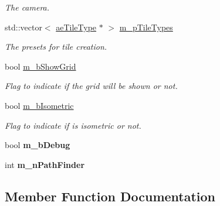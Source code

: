 \begin{DoxyCompactItemize}
\begin{DoxyCompactList}\small\item\em The camera. \end{DoxyCompactList}\item 
std\+::vector$<$ \hyperlink{classae_tile_type}{ae\+Tile\+Type} $\ast$ $>$ \hyperlink{classae_tiled_map_a09b498b021eb6ccdec0296355217b665}{m\+\_\+p\+Tile\+Types}\hypertarget{classae_tiled_map_a09b498b021eb6ccdec0296355217b665}{}\label{classae_tiled_map_a09b498b021eb6ccdec0296355217b665}

\begin{DoxyCompactList}\small\item\em The presets for tile creation. \end{DoxyCompactList}\item 
bool \hyperlink{classae_tiled_map_a88b87b8bc89f5768032ca6e33a82774a}{m\+\_\+b\+Show\+Grid}\hypertarget{classae_tiled_map_a88b87b8bc89f5768032ca6e33a82774a}{}\label{classae_tiled_map_a88b87b8bc89f5768032ca6e33a82774a}

\begin{DoxyCompactList}\small\item\em Flag to indicate if the grid will be shown or not. \end{DoxyCompactList}\item 
bool \hyperlink{classae_tiled_map_a705451931bd414b0d9b3d87164eae0fc}{m\+\_\+b\+Isometric}\hypertarget{classae_tiled_map_a705451931bd414b0d9b3d87164eae0fc}{}\label{classae_tiled_map_a705451931bd414b0d9b3d87164eae0fc}

\begin{DoxyCompactList}\small\item\em Flag to indicate if is isometric or not. \end{DoxyCompactList}\item 
bool {\bfseries m\+\_\+b\+Debug}\hypertarget{classae_tiled_map_a5eaca4b67487ab17c25d75527ed5e339}{}\label{classae_tiled_map_a5eaca4b67487ab17c25d75527ed5e339}

\item 
int {\bfseries m\+\_\+n\+Path\+Finder}\hypertarget{classae_tiled_map_ad47799807fc006d5ece12a1c2dbed7d8}{}\label{classae_tiled_map_ad47799807fc006d5ece12a1c2dbed7d8}

\end{DoxyCompactItemize}


\subsection{Member Function Documentation}
